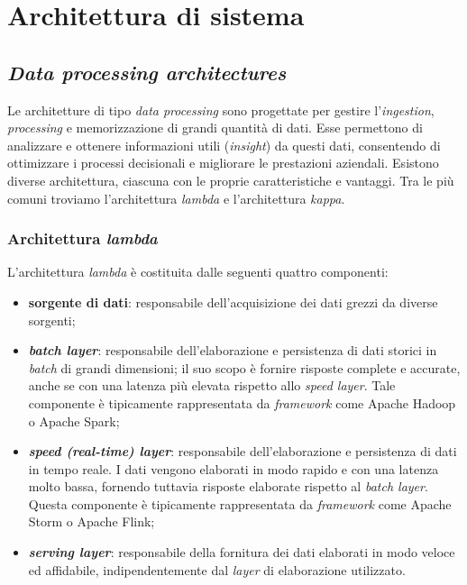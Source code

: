 \section{Architettura di sistema}

\subsection{\textit{Data processing architectures}}
Le architetture di tipo \textit{data processing} sono progettate per gestire l'\textit{ingestion}, \textit{processing} e memorizzazione di grandi quantità di dati.
Esse permettono di analizzare e ottenere informazioni utili (\textit{insight}) da questi dati, consentendo di ottimizzare i processi decisionali e migliorare le prestazioni aziendali.
Esistono diverse architettura, ciascuna con le proprie caratteristiche e vantaggi. Tra le più comuni troviamo l'architettura \textit{lambda} e l'architettura \textit{kappa}.

\subsubsection{Architettura \textit{lambda}}
L'architettura \textit{lambda} è costituita dalle seguenti quattro componenti:
\begin{itemize}
	\item \textbf{sorgente di dati}: responsabile dell'acquisizione dei dati grezzi da diverse sorgenti;
	\item \textbf{\textit{batch layer}}: responsabile dell'elaborazione e persistenza di dati storici in \textit{batch} di grandi dimensioni; il suo scopo è fornire risposte complete e accurate, anche se con una latenza più elevata rispetto allo \textit{speed layer}. Tale componente è tipicamente rappresentata da \textit{framework} come Apache Hadoop o Apache Spark;
	\item \textbf{\textit{speed (real-time) layer}}: responsabile dell'elaborazione e persistenza di dati in tempo reale. I dati vengono elaborati in modo rapido e con una latenza molto bassa, fornendo tuttavia risposte elaborate rispetto al \textit{batch layer}. Questa componente è tipicamente rappresentata da \textit{framework} come Apache Storm o Apache Flink;
	\item \textbf{\textit{serving layer}}: responsabile della fornitura dei dati elaborati in modo veloce ed affidabile, indipendentemente dal \textit{layer} di elaborazione utilizzato.
\end{itemize}

